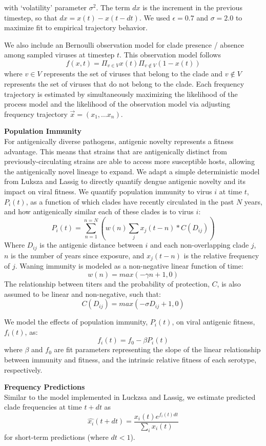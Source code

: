\documentclass[11pt,oneside,letterpaper]{article}
\begin{document}
with `volatility' parameter $\sigma^2$.
The term $dx$ is the increment in the previous timestep, so that $dx = x(t) - x(t-dt)$.
We used $\epsilon = 0.7$ and $\sigma = 2.0$ to maximize fit to empirical trajectory behavior.

We also include an Bernoulli observation model for clade presence / absence among sampled viruses at timestep $t$.
This observation model follows
$$f(x,t) = \Pi_{v \in V} x(t) \Pi_{v \notin V} (1-x(t))$$
where $v \in V$ represents the set of viruses that belong to the clade and $v \notin V$ represents the set of viruses that do not belong to the clade.
Each frequency trajectory is estimated by simultaneously
maximizing the likelihood of the process model and the likelihood
of the observation model via adjusting frequency trajectory $\vec{x} = (x_1, ... x_n)$.

\textbf{Population Immunity}\\
For antigenically diverse pathogens, antigenic novelty represents a fitness advantage.
This means that strains that are antigenically distinct from previously-circulating strains are able to access more susceptible hosts, allowing the antigenically novel lineage to expand.
We adapt a simple deterministic model from Luksza and Lassig to directly quantify dengue antigenic novelty and its impact on viral fitness.
We quantify population immunity to virus $i$ at time $t$, $P_i(t)$, as a function of which clades have recently circulated in the past $N$ years, and how antigenically similar each of these clades is to virus $i$:
$$P_i(t) = \sum_{n=1}^{n=N} (w(n)  \sum_{j} x_j(t-n) * C( D_{ij}))$$
Where $D_{ij}$ is the antigenic distance between $i$ and each non-overlapping clade $j$, $n$ is the number of years since exposure, and $x_j(t-n)$ is the relative frequency of $j$.
Waning immunity is modeled as a non-negative linear function of time:
$$w(n) = max(-\gamma n + 1, 0)$$
The relationship between titers and the probability of protection, $C$, is also assumed to be linear and non-negative, such that:
$$C(D_{ij}) = max(-\sigma D_{ij} + 1, 0)$$

We model the effects of population immunity, $P_i(t)$, on viral antigenic fitness, $f_i(t)$, as:
$$f_i(t) = f_0-\beta P_i(t)$$
where $\beta$ and $f_0$ are fit parameters representing the slope of the linear relationship between immunity and fitness, and the intrinsic relative fitness of each serotype, respectively.

\textbf{Frequency Predictions}\\
Similar to the model implemented in Luckzsa and Lassig, we estimate predicted clade frequencies at time $t + dt$ as
$$\hat{x_i}(t+dt) = \frac{x_i(t) e^{f_i(t) dt}}{\sum_{i}x_i(t)}$$
for short-term predictions (where $dt < 1$).
\end{document}
